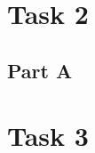 \documentclass[10pt]{article}
\begin{document}
\section*{Task 2}

\subsection*{Part A}

\section*{Task 3}



\nocite{*}

\end{document}
